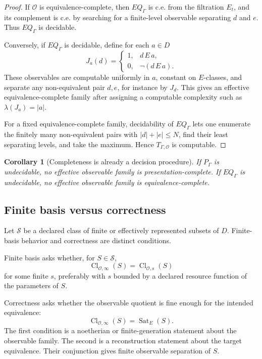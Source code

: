\documentclass[11pt]{article}
\newtheorem{corollary}[theorem]{Corollary}
\theoremstyle{definition}
\theoremstyle{remark}
\begin{document}
\begin{proof}
If \(\mathcal O\) is equivalence-complete, then \(EQ_\Gamma\) is c.e. from the filtration \(E_t\), and its complement is c.e. by searching for a finite-level observable separating \(d\) and \(e\).  Thus \(EQ_\Gamma\) is decidable.

Conversely, if \(EQ_\Gamma\) is decidable, define for each \(a\in D\)
\[
J_a(d)=
\begin{cases}
1,& d\,E\,a,\\
0,& \neg(d\,E\,a).
\end{cases}
\]
These observables are computable uniformly in \(a\), constant on \(E\)-classes, and separate any non-equivalent pair \(d,e\), for instance by \(J_d\).  This gives an effective equivalence-complete family after assigning a computable complexity such as \(\lambda(J_a)=|a|\).

For a fixed equivalence-complete family, decidability of \(EQ_\Gamma\) lets one enumerate the finitely many non-equivalent pairs with \(|d|+|e|\leq N\), find their least separating levels, and take the maximum.  Hence \(T_{\Gamma,\mathcal O}\) is computable.
\end{proof}

\begin{corollary}[Completeness is already a decision procedure]
If \(P_\Gamma\) is undecidable, no effective observable family is presentation-complete.  If \(EQ_\Gamma\) is undecidable, no effective observable family is equivalence-complete.
\end{corollary}

\subsection{Finite basis versus correctness}

Let \(\mathcal S\) be a declared class of finite or effectively represented subsets of \(D\).  Finite-basis behavior and correctness are distinct conditions.

Finite basis asks whether, for \(S\in\mathcal S\),
\[
\operatorname{Cl}_{\mathcal O,\infty}(S)
=
\operatorname{Cl}_{\mathcal O,s}(S)
\]
for some finite \(s\), preferably with \(s\) bounded by a declared resource function of the parameters of \(S\).

Correctness asks whether the observable quotient is fine enough for the intended equivalence:
\[
\operatorname{Cl}_{\mathcal O,\infty}(S)
=
\operatorname{Sat}_E(S).
\]
The first condition is a noetherian or finite-generation statement about the observable family.  The second is a reconstruction statement about the target equivalence.  Their conjunction gives finite observable separation of \(S\).
\end{document}
